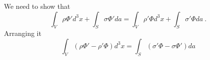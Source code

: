 \documentclass[12pt]{article}
\begin{document}
\newpage
{} We need to show that
\begin{equation}
    \int_V \rho \Phi' d^3x + \int_S \sigma \Phi' da = \int_V \rho' \Phi d^3x + \int_S \sigma' \Phi da~.
\end{equation}
Arranging it
\begin{equation}
    \int_V(\rho \Phi' - \rho' \Phi) d^3x = \int_S(\sigma' \Phi - \sigma \Phi') da
\end{equation}
\end{document}
